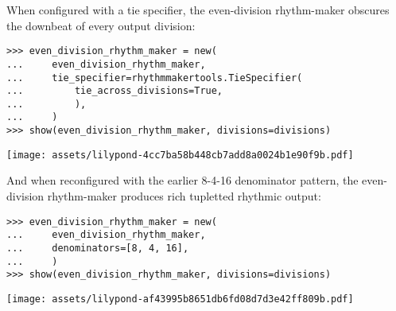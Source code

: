 \noindent When configured with a tie specifier, the even-division rhythm-maker
obscures the downbeat of every output division:

\begin{comment}
<abjad>
even_division_rhythm_maker = new(
    even_division_rhythm_maker,
    tie_specifier=rhythmmakertools.TieSpecifier(
        tie_across_divisions=True,
        ),
    )
show(even_division_rhythm_maker, divisions=divisions)
</abjad>
\end{comment}

\begin{abjadbookoutput}
\begin{singlespacing}
\vspace{-0.5\baselineskip}
\begin{lstlisting}
>>> even_division_rhythm_maker = new(
...     even_division_rhythm_maker,
...     tie_specifier=rhythmmakertools.TieSpecifier(
...         tie_across_divisions=True,
...         ),
...     )
>>> show(even_division_rhythm_maker, divisions=divisions)
\end{lstlisting}
\noindent\texttt{[image: assets/lilypond-4cc7ba58b448cb7add8a0024b1e90f9b.pdf]}
\end{singlespacing}
\end{abjadbookoutput}

\noindent And when reconfigured with the earlier 8-4-16 denominator pattern,
the even-division rhythm-maker produces rich tupletted rhythmic output:

\begin{comment}
<abjad>
even_division_rhythm_maker = new(
    even_division_rhythm_maker,
    denominators=[8, 4, 16],
    )
show(even_division_rhythm_maker, divisions=divisions)
</abjad>
\end{comment}

\begin{abjadbookoutput}
\begin{singlespacing}
\vspace{-0.5\baselineskip}
\begin{lstlisting}
>>> even_division_rhythm_maker = new(
...     even_division_rhythm_maker,
...     denominators=[8, 4, 16],
...     )
>>> show(even_division_rhythm_maker, divisions=divisions)
\end{lstlisting}
\noindent\texttt{[image: assets/lilypond-af43995b8651db6fd08d7d3e42ff809b.pdf]}
\end{singlespacing}
\end{abjadbookoutput}

